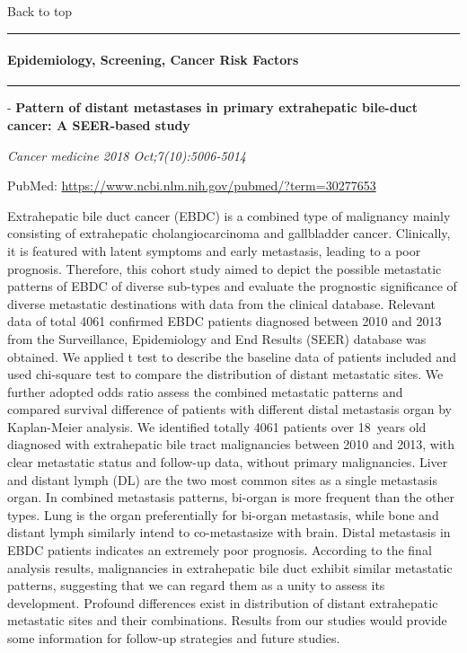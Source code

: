 \documentclass[]{article}
\let\oldparagraph\paragraph
\renewcommand{\paragraph}[1]{\oldparagraph{#1}\mbox{}}
\begin{document}
Back to top

\begin{center}\rule{0.5\linewidth}{\linethickness}\end{center}

\pagebreak

\hypertarget{epidemiology-screening-cancer-risk-factors-1}{%
\paragraph{Epidemiology, Screening, Cancer Risk
Factors}\label{epidemiology-screening-cancer-risk-factors-1}}

\begin{center}\rule{0.5\linewidth}{\linethickness}\end{center}

 - \textbf{Pattern of distant metastases in primary extrahepatic
bile-duct cancer: A SEER-based study}

\emph{Cancer medicine 2018 Oct;7(10):5006-5014}

PubMed: \url{https://www.ncbi.nlm.nih.gov/pubmed/?term=30277653}

Extrahepatic bile duct cancer (EBDC) is a combined type of malignancy
mainly consisting of extrahepatic cholangiocarcinoma and gallbladder
cancer. Clinically, it is featured with latent symptoms and early
metastasis, leading to a poor prognosis. Therefore, this cohort study
aimed to depict the possible metastatic patterns of EBDC of diverse
sub-types and evaluate the prognostic significance of diverse metastatic
destinations with data from the clinical database. Relevant data of
total 4061 confirmed EBDC patients diagnosed between 2010 and 2013 from
the Surveillance, Epidemiology and End Results (SEER) database was
obtained. We applied t test to describe the baseline data of patients
included and used chi-square test to compare the distribution of distant
metastatic sites. We further adopted odds ratio assess the combined
metastatic patterns and compared survival difference of patients with
different distal metastasis organ by Kaplan-Meier analysis. We
identified totally 4061 patients over 18~years old diagnosed with
extrahepatic bile tract malignancies between 2010 and 2013, with clear
metastatic status and follow-up data, without primary malignancies.
Liver and distant lymph (DL) are the two most common sites as a single
metastasis organ. In combined metastasis patterns, bi-organ is more
frequent than the other types. Lung is the organ preferentially for
bi-organ metastasis, while bone and distant lymph similarly intend to
co-metastasize with brain. Distal metastasis in EBDC patients indicates
an extremely poor prognosis. According to the final analysis results,
malignancies in extrahepatic bile duct exhibit similar metastatic
patterns, suggesting that we can regard them as a unity to assess its
development. Profound differences exist in distribution of distant
extrahepatic metastatic sites and their combinations. Results from our
studies would provide some information for follow-up strategies and
future studies.
\end{document}
